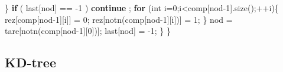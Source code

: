 \documentclass[10pt,]{article}
\newenvironment{Shaded}{}{}
\newcommand{\KeywordTok}[1]{\textcolor[rgb]{0.00,0.44,0.13}{\textbf{{#1}}}}
\newcommand{\DataTypeTok}[1]{\textcolor[rgb]{0.56,0.13,0.00}{{#1}}}
\newcommand{\DecValTok}[1]{\textcolor[rgb]{0.25,0.63,0.44}{{#1}}}
\newcommand{\NormalTok}[1]{{#1}}
\begin{document}
\begin{Shaded}
\begin{Highlighting}[]
    \NormalTok{\}}
    \KeywordTok{if} \NormalTok{( last[nod] == -}\DecValTok{1} \NormalTok{)  }\KeywordTok{continue} \NormalTok{;}
    \KeywordTok{for} \NormalTok{(}\DataTypeTok{int} \NormalTok{i=}\DecValTok{0}\NormalTok{;i<comp[nod}\DecValTok{-1}\NormalTok{].size();++i)\{}
      \NormalTok{rez[comp[nod}\DecValTok{-1}\NormalTok{][i]] = }\DecValTok{0}\NormalTok{;}
      \NormalTok{rez[notn(comp[nod}\DecValTok{-1}\NormalTok{][i])] = }\DecValTok{1}\NormalTok{;}
    \NormalTok{\}}
    \NormalTok{nod = tare[notn(comp[nod}\DecValTok{-1}\NormalTok{][}\DecValTok{0}\NormalTok{])];}
    \NormalTok{last[nod] = -}\DecValTok{1}\NormalTok{;}
  \NormalTok{\}}
\NormalTok{\}}
\end{Highlighting}
\end{Shaded}

\subsection{KD-tree}
\end{document}
